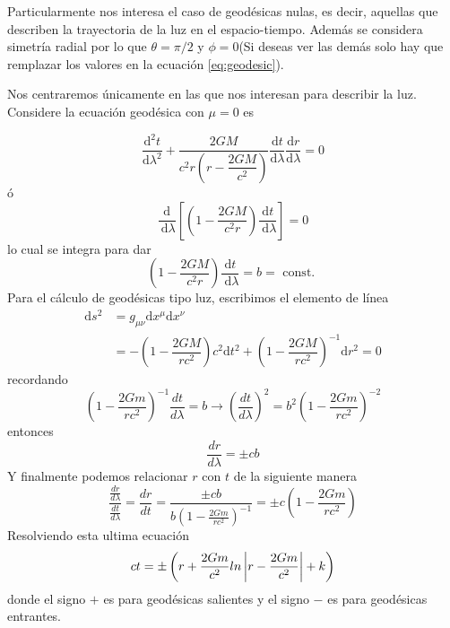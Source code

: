 Particularmente nos interesa el caso de geodésicas nulas, es decir, aquellas que describen la trayectoria de la luz en el espacio-tiempo. Además se considera simetría radial por lo que $\theta=\pi/2$ y $\phi=0$(Si deseas ver las demás solo hay que remplazar los valores en la ecuación \ref{eq:geodesic}).

Nos centraremos únicamente en las que nos interesan para describir la luz. Considere  la ecuación geodésica con $\mu=0$ es

$$
    \frac{\mathrm{d}^2 t}{\mathrm{d} \lambda^2}+\dfrac{2 G M}{c^2 r\left(r - \dfrac{2 G M}{c^2}\right)} \frac{\mathrm{d} t}{\mathrm{d} \lambda} \frac{\mathrm{d} r}{\mathrm{d} \lambda}=0
$$
ó
$$
    \frac{\mathrm{d}}{\mathrm{~d} \lambda}\left[\left(1-\dfrac{2 G M}{c^2 r}\right) \frac{\mathrm{d} t}{\mathrm{~d} \lambda}\right]=0
$$
lo cual se integra para dar
$$
    \left(1-\dfrac{2 G M}{c^2 r}\right) \frac{\mathrm{d} t}{\mathrm{~d} \lambda}=b=\text { const. }
$$
Para el cálculo de geodésicas tipo luz, escribimos el elemento de línea
\begin{equation}
    \begin{aligned}
        \mathrm{d} s^2 & =g_{\mu \nu} \mathrm{d} x^\mu \mathrm{d} x^\nu                                                                      \\
                       & =-\left(1-\dfrac{2 G M}{r c^2}\right)c^2 \mathrm{d} t^2+\left(1-\dfrac{2 G M}{r c^2}\right)^{-1} \mathrm{d} r^2 = 0
    \end{aligned}
\end{equation}
recordando
\begin{equation}
    \left(1-\frac{2 G m}{r c^2}\right)^{-1} \frac{dt}{d\lambda}  = b \rightarrow  \left(\frac{dt}{d\lambda}\right)^2 = b^2 \left(1-\frac{2 G m}{r c^2}\right)^{-2}
\end{equation}
entonces
\begin{equation}
    \frac{d r }{d \lambda}= \pm cb
\end{equation}
Y finalmente podemos relacionar $r$ con $t$  de la siguiente manera
\begin{equation}
    \frac{\frac{dr}{d\lambda}}{\frac{dt}{d\lambda}} =   \frac{dr}{dt} =  \frac{\pm cb }{ b \left(1-\frac{2 G m}{r c^2}\right)^{-1}} = \pm c \left(1-\frac{2 G m}{r c^2}\right)
\end{equation}
Resolviendo esta ultima ecuación
\begin{equation}
    ct = \pm \left(r + \frac{2 G m}{c^2}ln\left| r -\frac{2 G m}{c^2}  \right| + k \right)
\end{equation}
donde el signo $+$ es para geodésicas salientes y el signo $-$ es para geodésicas entrantes.


